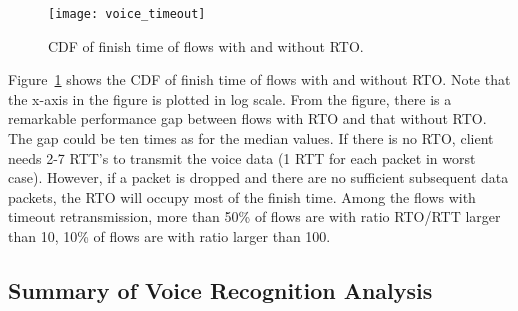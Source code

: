 
\begin{figure}[th]
\centering
	\texttt{[image: voice\_timeout]}
\caption{CDF of finish time of flows with and without RTO.}
\label{fig:voice_rto}
\end{figure}

Figure~\ref{fig:voice_rto} shows the CDF of finish time of flows with and without RTO. Note that the x-axis in the figure is plotted in log scale. From the figure, there is a remarkable performance gap between flows with RTO and that without RTO. The gap could be ten times as for the median values. If there is no RTO, client needs 2-7 RTT's to transmit the voice data (1 RTT for each packet in worst case). However, if a packet is dropped and there are no sufficient subsequent data packets, the RTO will occupy most of the finish time. Among the flows with timeout retransmission, more than 50\% of flows are with ratio RTO/RTT larger than 10, 10\% of flows are with ratio larger than 100.

\subsection{Summary of Voice Recognition Analysis}

